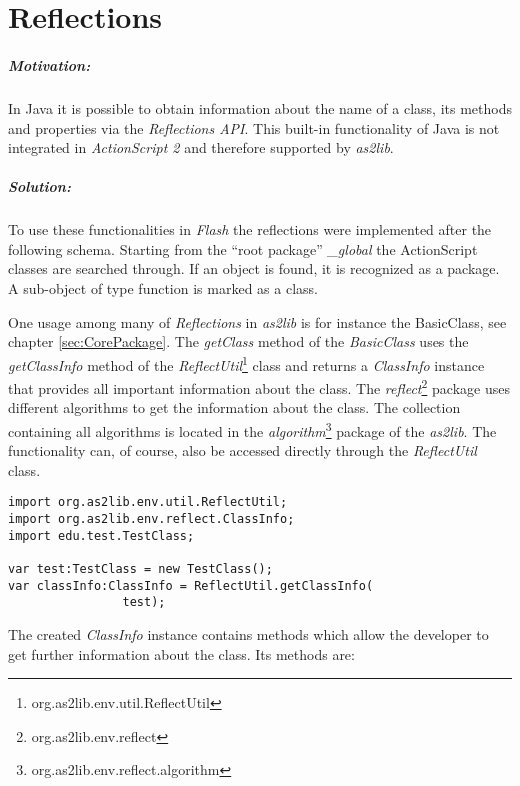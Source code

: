 \chapter{Reflections}
\label{sec:Reflections}

\paragraph{Motivation:}

In Java it is possible to obtain information about the name of a class, its methods and properties via the \emph{Reflections API}. This built-in functionality of Java is not integrated in {\sl ActionScript 2} and therefore supported by {\sl as2lib}.

\paragraph{Solution:}
To use these functionalities in {\sl Flash} the reflections were implemented after the following schema.
Starting from the "`root package"' \emph{\_global} the ActionScript classes are searched through. If an object is found, it is recognized as a package. A sub-object of type function is marked as a class. 


One usage among many of \emph{Reflections} in {\sl as2lib} is for instance the BasicClass, see chapter \ref{sec:CorePackage}. The \emph{getClass} method of the \emph{BasicClass} uses the \emph{getClassInfo} method of the \emph{ReflectUtil}\footnote{org.as2lib.env.util.ReflectUtil} class and returns a \emph{ClassInfo} instance that provides all important information about the class. The \emph{reflect}\footnote{org.as2lib.env.reflect} package uses different algorithms to get the information about the class. The collection containing all algorithms is located in the \emph{algorithm}\footnote{org.as2lib.env.reflect.algorithm} package of the \emph{as2lib}. The functionality can, of course, also be accessed directly through the \emph{ReflectUtil} class.
\begin{lstlisting}[frame=single]
import org.as2lib.env.util.ReflectUtil;
import org.as2lib.env.reflect.ClassInfo;
import edu.test.TestClass;

var test:TestClass = new TestClass();
var classInfo:ClassInfo = ReflectUtil.getClassInfo(
				test);
\end{lstlisting}
The created \emph{ClassInfo} instance contains methods which allow the developer to get further information about the class.
Its methods are:

